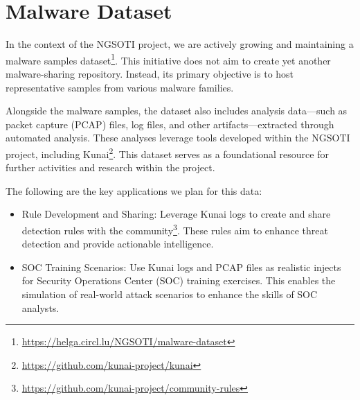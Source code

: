 \chapter{Malware Dataset}

In the context of the NGSOTI project, we are actively growing and maintaining a malware samples dataset\footnote{\href{https://helga.circl.lu/NGSOTI/malware-dataset}{https://helga.circl.lu/NGSOTI/malware-dataset}}. This initiative does not aim to create yet another malware-sharing repository. Instead, its primary objective is to host representative samples from various malware families.

Alongside the malware samples, the dataset also includes analysis data—such as packet capture (PCAP) files, log files, and other artifacts—extracted through automated analysis. These analyses leverage tools developed within the NGSOTI project, including Kunai\footnote{\href{https://github.com/kunai-project/kunai}{https://github.com/kunai-project/kunai}}. This dataset serves as a foundational resource for further activities and research within the project.

The following are the key applications we plan for this data:

\begin{itemize}
	\item Rule Development and Sharing: Leverage Kunai logs to create and share detection rules with the community\footnote{\href{https://github.com/kunai-project/community-rules}{https://github.com/kunai-project/community-rules}}. These rules aim to enhance threat detection and provide actionable intelligence.
	\item SOC Training Scenarios: Use Kunai logs and PCAP files as realistic injects for Security Operations Center (SOC) training exercises. This enables the simulation of real-world attack scenarios to enhance the skills of SOC analysts.
\end{itemize}


